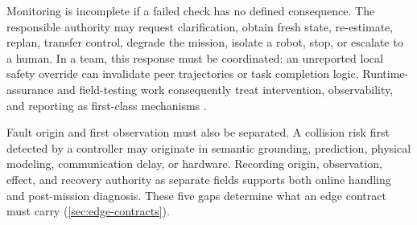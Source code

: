 Monitoring is incomplete if a failed check has no defined consequence.  The
responsible authority may request clarification, obtain fresh state, re-estimate,
replan, transfer control, degrade the mission, isolate a robot, stop, or escalate
to a human.  In a team, this response must be coordinated: an unreported local
safety override can invalidate peer trajectories or task completion logic.
Runtime-assurance and field-testing work consequently treat intervention,
observability, and reporting as first-class mechanisms
\cite{desai2019soter,shivakumar2020soterros,caldas2024rvft}.

Fault origin and first observation must also be separated.  A collision risk
first detected by a controller may originate in semantic grounding, prediction,
physical modeling, communication delay, or hardware.  Recording origin,
observation, effect, and recovery authority as separate fields supports both
online handling and post-mission diagnosis.  These five gaps determine what an
edge contract must carry (\cref{sec:edge-contracts}).
